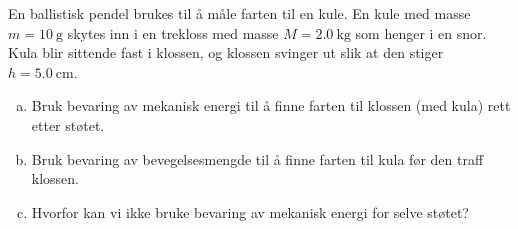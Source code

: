 %
En ballistisk pendel brukes til å måle farten til en kule. En kule med masse $m = \SI{10}{\gram}$ skytes inn i en trekloss med masse $M = \SI{2.0}{\kilo\gram}$ som henger i en snor. Kula blir sittende fast i klossen, og klossen svinger ut slik at den stiger $h = \SI{5.0}{\centi\metre}$.
\begin{enumerate}[a)]
    \item Bruk bevaring av mekanisk energi til å finne farten til klossen (med kula) rett etter støtet.
    \item Bruk bevaring av bevegelsesmengde til å finne farten til kula før den traff klossen.
    \item Hvorfor kan vi ikke bruke bevaring av mekanisk energi for selve støtet?
\end{enumerate}
